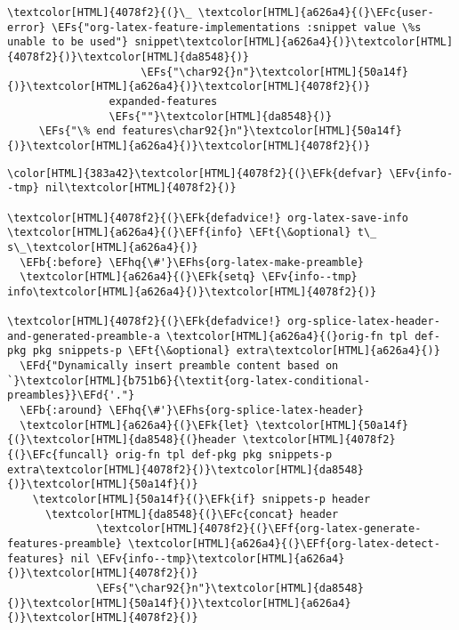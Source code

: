 \documentclass{scrartcl}
\newcommand{\EFk}[1]{\textcolor{EFk}{#1}} %
\newcommand{\EFd}[1]{\textcolor{EFd}{\textit{#1}}} %
\newcommand{\EFt}[1]{\textcolor{EFt}{#1}} %
\newcommand{\EFs}[1]{\textcolor{EFs}{#1}} %
\newcommand{\EFb}[1]{\textcolor{EFb}{#1}} %
\newcommand{\EFc}[1]{\textcolor{EFc}{#1}} %
\newcommand{\EFv}[1]{\textcolor{EFv}{#1}} %
\newcommand{\EFf}[1]{\textcolor{EFf}{#1}} %
\newcommand{\EFhq}[1]{\textcolor{EFhq}{#1}} %
\newcommand{\EFhs}[1]{\textcolor{EFhs}{#1}} %
\begin{document}
\begin{enumerate}
\begin{Code}
\begin{Verbatim}[]
                       \textcolor[HTML]{4078f2}{(}\_ \textcolor[HTML]{a626a4}{(}\EFc{user-error} \EFs{"org-latex-feature-implementations :snippet value \%s unable to be used"} snippet\textcolor[HTML]{a626a4}{)}\textcolor[HTML]{4078f2}{)}\textcolor[HTML]{da8548}{)}
                     \EFs{"\char92{}n"}\textcolor[HTML]{50a14f}{)}\textcolor[HTML]{a626a4}{)}\textcolor[HTML]{4078f2}{)}
                expanded-features
                \EFs{""}\textcolor[HTML]{da8548}{)}
     \EFs{"\% end features\char92{}n"}\textcolor[HTML]{50a14f}{)}\textcolor[HTML]{a626a4}{)}\textcolor[HTML]{4078f2}{)}
\end{Verbatim}
\end{Code}

\begin{Code}
\begin{Verbatim}[]
\color[HTML]{383a42}\textcolor[HTML]{4078f2}{(}\EFk{defvar} \EFv{info--tmp} nil\textcolor[HTML]{4078f2}{)}

\textcolor[HTML]{4078f2}{(}\EFk{defadvice!} org-latex-save-info \textcolor[HTML]{a626a4}{(}\EFf{info} \EFt{\&optional} t\_ s\_\textcolor[HTML]{a626a4}{)}
  \EFb{:before} \EFhq{\#'}\EFhs{org-latex-make-preamble}
  \textcolor[HTML]{a626a4}{(}\EFk{setq} \EFv{info--tmp} info\textcolor[HTML]{a626a4}{)}\textcolor[HTML]{4078f2}{)}

\textcolor[HTML]{4078f2}{(}\EFk{defadvice!} org-splice-latex-header-and-generated-preamble-a \textcolor[HTML]{a626a4}{(}orig-fn tpl def-pkg pkg snippets-p \EFt{\&optional} extra\textcolor[HTML]{a626a4}{)}
  \EFd{"Dynamically insert preamble content based on `}\textcolor[HTML]{b751b6}{\textit{org-latex-conditional-preambles}}\EFd{'."}
  \EFb{:around} \EFhq{\#'}\EFhs{org-splice-latex-header}
  \textcolor[HTML]{a626a4}{(}\EFk{let} \textcolor[HTML]{50a14f}{(}\textcolor[HTML]{da8548}{(}header \textcolor[HTML]{4078f2}{(}\EFc{funcall} orig-fn tpl def-pkg pkg snippets-p extra\textcolor[HTML]{4078f2}{)}\textcolor[HTML]{da8548}{)}\textcolor[HTML]{50a14f}{)}
    \textcolor[HTML]{50a14f}{(}\EFk{if} snippets-p header
      \textcolor[HTML]{da8548}{(}\EFc{concat} header
              \textcolor[HTML]{4078f2}{(}\EFf{org-latex-generate-features-preamble} \textcolor[HTML]{a626a4}{(}\EFf{org-latex-detect-features} nil \EFv{info--tmp}\textcolor[HTML]{a626a4}{)}\textcolor[HTML]{4078f2}{)}
              \EFs{"\char92{}n"}\textcolor[HTML]{da8548}{)}\textcolor[HTML]{50a14f}{)}\textcolor[HTML]{a626a4}{)}\textcolor[HTML]{4078f2}{)}
\end{Verbatim}
\end{Code}


\end{enumerate}
\end{document}
